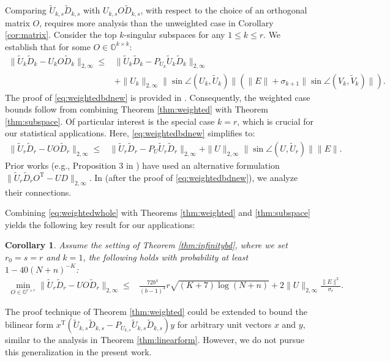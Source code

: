 \documentclass[reqno]{amsart}
\newcommand{\T}{\mathrm{T}}
\theoremstyle{plain}
\newtheorem{corollary}[theorem]{Corollary}
\theoremstyle{definition}
\begin{document}
Comparing  $\widetilde{U}_{k,s}\widetilde{D}_{k,s}$ with ${U}_{k,s}O\widetilde{D}_{k,s}$, with respect to the choice of an orthogonal matrix $O$, requires more analysis than the unweighted case in Corollary \ref{cor:matrix}. Consider the top $k$-singular subspaces for any $1\le k \le r$. We establish that for some $O\in\mathbb{O}^{k\times k}$:
 \begin{align}\label{eq:weightedbdnew}
 \| \widetilde{U}_{k}\widetilde{D}_{k} - {U}_kO\widetilde{D}_{k}\|_{2,\infty}\le &\| \widetilde{U}_{k}\widetilde{D}_{k} - P_{U_k} \widetilde{U}_{k} \widetilde{D}_{k}\|_{2,\infty}\nonumber\\
 &+ \|U_k\|_{2,\infty} \|\sin\angle(U_k, \widetilde U_{k})\| \left(\|E\| +\sigma_{k+1}\|\sin\angle(V_k, \widetilde V_{k})\|\right) .
 \end{align}
The proof of \eqref{eq:weightedbdnew} is provided in \cite{WangSupp24}. Consequently, the weighted case bounds follow from combining Theorem \ref{thm:weighted} with Theorem \ref{thm:subspace}. Of particular interest is the special case $k=r$, which is crucial for our statistical applications. Here, \eqref{eq:weightedbdnew} simplifies to:
\begin{align}\label{eq:weightedwhole}
\| \widetilde{U}_{r}\widetilde{D}_{r} - {U}O\widetilde{D}_{r}\|_{2,\infty}\le &\| \widetilde{U}_{r}\widetilde{D}_{r} - P_{U} \widetilde{U}_{r} \widetilde{D}_{r}\|_{2,\infty}+ \|U\|_{2,\infty} \|\sin\angle(U, \widetilde U_{r})\| \|E\|.
\end{align}
Prior works (e.g., Proposition 3 in \cite{YW24}) have used an alternative formulation $\|\widetilde{U}_r \widetilde{D}_r O^\T- U D \|_{2,\infty}$. In \cite{WangSupp24} (after the proof of \eqref{eq:weightedbdnew}), we analyze their connections. %

Combining \eqref{eq:weightedwhole} with Theorems \ref{thm:weighted} and \ref{thm:subspace} yields the following key result for our applications:
\begin{corollary}\label{cor:weighted}
Assume the setting of Theorem \ref{thm:infinitybd}, where we set $r_0=s=r$ and $k=1$, the following holds with probability at least $1 - 40(N+n)^{-K}$:
\begin{align*}
\min_{O\in \mathbb{O}^{r\times r}}\| \widetilde{U}_{r}\widetilde{D}_{r} - U O \widetilde{D}_{r}\|_{2,\infty}\le &\frac{72 b^4}{(b-1)^4} r\sqrt{(K+7)\log(N+n)} + 2\|U\|_{2,\infty}  \frac{ \|E\|^2}{\sigma_r}.
\end{align*}
\end{corollary}
The proof technique of Theorem \ref{thm:weighted} could be extended to bound the bilinear form $x^\T(\widetilde{U}_{k,s}\widetilde{D}_{k,s} - P_{U_{k,s}} \widetilde{U}_{k,s} \widetilde{D}_{k,s})y$ for arbitrary unit vectors $x$ and $y$, similar to the analysis in Theorem \ref{thm:linearform}. However, we do not pursue this generalization in the present work.
\end{document}
